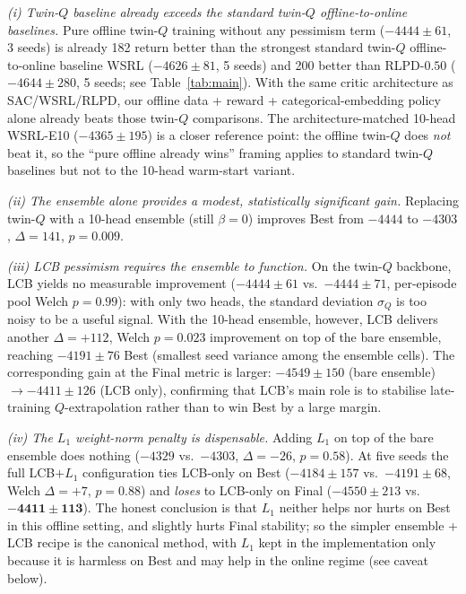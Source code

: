 \documentclass[journal,10pt]{IEEEtran}
\begin{document}
\emph{(i) Twin-$Q$ baseline already exceeds the standard twin-$Q$ offline-to-online baselines.} Pure offline twin-$Q$ training without any pessimism term ($-4444 \pm 61$, 3 seeds) is already 182 return better than the strongest standard twin-$Q$ offline-to-online baseline WSRL ($-4626 \pm 81$, 5 seeds) and 200 better than RLPD-$0.50$ ($-4644 \pm 280$, 5 seeds; see Table~\ref{tab:main}). With the same critic architecture as SAC/WSRL/RLPD, our offline data + reward + categorical-embedding policy alone already beats those twin-$Q$ comparisons. The architecture-matched 10-head WSRL-E10 ($-4365 \pm 195$) is a closer reference point: the offline twin-$Q$ does \emph{not} beat it, so the ``pure offline already wins'' framing applies to standard twin-$Q$ baselines but not to the 10-head warm-start variant.

\emph{(ii) The ensemble alone provides a modest, statistically significant gain.} Replacing twin-$Q$ with a 10-head ensemble (still $\beta=0$) improves Best from $-4444$ to $-4303$, $\Delta=141$, $p=0.009$.

\emph{(iii) LCB pessimism requires the ensemble to function.} On the twin-$Q$ backbone, LCB yields no measurable improvement ($-4444 \pm 61$ vs.\ $-4444 \pm 71$, per-episode pool Welch $p=0.99$): with only two heads, the standard deviation $\sigma_Q$ is too noisy to be a useful signal. With the 10-head ensemble, however, LCB delivers another $\Delta=+112$, Welch $p=0.023$ improvement on top of the bare ensemble, reaching $-4191 \pm 76$ Best (smallest seed variance among the ensemble cells). The corresponding gain at the Final metric is larger: $-4549 \pm 150$ (bare ensemble) $\rightarrow -4411 \pm 126$ (LCB only), confirming that LCB's main role is to stabilise late-training $Q$-extrapolation rather than to win Best by a large margin.

\emph{(iv) The $L_1$ weight-norm penalty is dispensable.} Adding $L_1$ on top of the bare ensemble does nothing ($-4329$ vs.\ $-4303$, $\Delta=-26$, $p=0.58$). At five seeds the full LCB$+L_1$ configuration ties LCB-only on Best ($-4184 \pm 157$ vs.\ $-4191 \pm 68$, Welch $\Delta=+7$, $p=0.88$) and \emph{loses} to LCB-only on Final ($-4550 \pm 213$ vs.\ $\mathbf{-4411 \pm 113}$). The honest conclusion is that $L_1$ neither helps nor hurts on Best in this offline setting, and slightly hurts Final stability; so the simpler ensemble + LCB recipe is the canonical method, with $L_1$ kept in the implementation only because it is harmless on Best and may help in the online regime (see caveat below).
\end{document}
